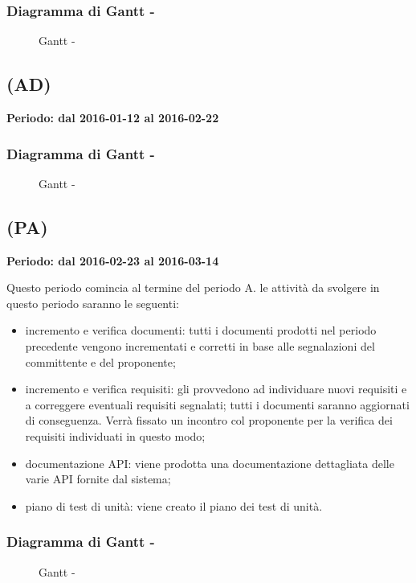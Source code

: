 \documentclass[./PianoDiProgetto.tex]{subfiles}
\begin{document}
  \subsubsection{Diagramma di Gantt - \PerAR}
    \begin{figure}[!h]
    \centering
    \caption{Gantt - \PerAR}
    \end{figure}

	\subsection{\PerAD{} (AD)}
  \textbf{Periodo: dal 2016-01-12 al 2016-02-22}

  \subsubsection{Diagramma di Gantt - \PerAD}
    \begin{figure}[!h]
    \centering
    \caption{Gantt - \PerAD}
    \end{figure}

  \subsection{\PerPA{} (PA)}
  \textbf{Periodo: dal 2016-02-23 al 2016-03-14}

  Questo periodo comincia al termine del periodo A.  le attività da svolgere in questo periodo saranno le seguenti:
  \begin{itemize}
    \item incremento e verifica documenti: tutti i documenti prodotti nel periodo precedente vengono incrementati e corretti in base alle segnalazioni del committente e del proponente;
    \item incremento e verifica requisiti:  gli \ANP provvedono ad individuare nuovi requisiti e a correggere eventuali requisiti segnalati; tutti i documenti saranno aggiornati di conseguenza. Verrà fissato un incontro col proponente per la verifica dei requisiti individuati in questo modo;
    \item documentazione API: viene prodotta una documentazione dettagliata delle varie API fornite dal sistema;
    \item piano di test di unità: viene creato il piano dei test di unità.
  \end{itemize}
  \subsubsection{Diagramma di Gantt - \PerPA}
    \begin{figure}[!h]
    \centering
    \caption{Gantt - \PerPA}
    \end{figure}
\end{document}
